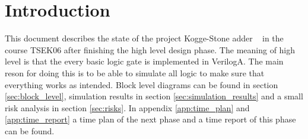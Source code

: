 \section{Introduction}
This document describes the state of the project Kogge-Stone adder ~\cite{projectdescription} in the course TSEK06 after finishing the high level design phase. The meaning of high level is that the every basic logic gate is implemented in VerilogA. The main reson for doing this is to be able to simulate all logic to make sure that everything works as intended. Block level diagrams can be found in section \ref{sec:block_level}, simulation results in section \ref{sec:simulation_results} and a small risk analysis in section \ref{sec:risks}. In appendix \ref{app:time_plan} and \ref{app:time_report} a time plan of the next phase and a time report of this phase can be found.
